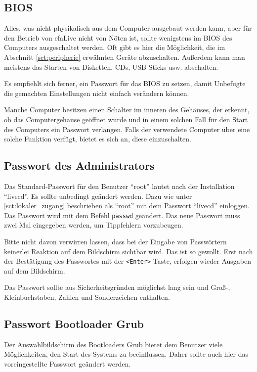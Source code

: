 \documentclass[a4paper,12pt,twoside]{article}
\begin{document}
\subsection{BIOS}
\label{sct:bios}
Alles, was nicht physikalisch aus dem Computer ausgebaut werden kann,
aber für den Betrieb von efaLive nicht von Nöten ist, sollte wenigstens
im BIOS des Computers ausgeschaltet werden. Oft gibt es hier die
Möglichkeit, die im Abschnitt \ref{sct:peripherie} erwähnten Geräte abzuschalten.
Außerdem kann man meistens das Starten von Disketten, CDs, USB Sticks
usw. abschalten.

Es empfiehlt sich ferner, ein Passwort für das BIOS zu setzen, damit
Unbefugte die gemachten Einstellungen nicht einfach verändern können.

Manche Computer besitzen einen Schalter im inneren des Gehäuses, der
erkennt, ob das Computergehäuse geöffnet wurde und in einem solchen
Fall für den Start des Computers ein Passwort verlangen. Falls der
verwendete Computer über eine solche Funktion verfügt, bietet es sich
an, diese einzuschalten.


\subsection{Passwort des Administrators}
\label{sct:password_admin}
Das Standard-Passwort für den Benutzer "`root"' lautet nach der Installation
"`livecd"'. Es sollte unbedingt geändert werden. Dazu wie unter \ref{sct:lokaler_zugang} beschrieben als
"`root"' mit dem Passwort "`livecd"' einloggen. Das Passwort wird mit
dem Befehl \texttt{passwd} geändert. Das neue
Passwort muss zwei Mal eingegeben werden, um Tippfehlern vorzubeugen. 

Bitte nicht davon verwirren lassen, dass bei der Eingabe von Passwörtern
keinerlei Reaktion auf dem Bildschirm sichtbar wird. Das ist so
gewollt. Erst nach der Bestätigung des Passwortes mit der
\texttt{{\textless}Enter{\textgreater}} Taste, erfolgen wieder Ausgaben auf dem
Bildschirm.

Das Passwort sollte aus Sicherheitsgründen möglichst lang sein und
Groß-, Kleinbuchstaben, Zahlen und Sonderzeichen enthalten.


\subsection{Passwort Bootloader Grub}
\label{sct:passwort_grub}
Der Auswahlbildschirm des Bootloaders Grub \cite{GRB1} bietet dem
Benutzer viele Möglichkeiten, den Start des Systems zu beeinflussen.
Daher sollte auch hier das voreingestellte Passwort geändert werden.
\end{document}
